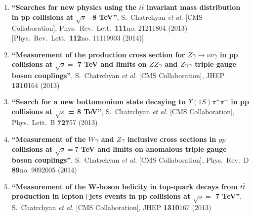 \begin{enumerate}
\item%
{\bf ``Searches for new physics using the $t\bar{t}$ invariant mass distribution in pp collisions at $\sqrt{s}$=8 TeV''}, 
  S.~Chatrchyan {\it et al.}  [CMS Collaboration], 
Phys.\ Rev.\ Lett.\  {\bf 111}no. 21211804 (2013)[Phys.\ Rev.\ Lett.\  {\bf 112}no. 11119903 (2014)] %


\item%
{\bf ``Measurement of the production cross section for $Z\gamma \to \nu\bar{\nu}\gamma$ in pp collisions at $\sqrt{s} =$ 7 TeV and limits on $ZZ\gamma$ and $Z\gamma\gamma$ triple gauge boson couplings''}, 
  S.~Chatrchyan {\it et al.}  [CMS Collaboration], 
JHEP {\bf 1310}164 (2013) %


\item%
{\bf ``Search for a new bottomonium state decaying to $\Upsilon(1S)\pi^+\pi^-$ in pp collisions at $\sqrt{s}$ = 8 TeV''}, 
  S.~Chatrchyan {\it et al.}  [CMS Collaboration], 
Phys.\ Lett.\ B {\bf 727}57 (2013) %


\item%
{\bf ``Measurement of the $W\gamma$ and $Z\gamma$ inclusive cross sections in $pp$ collisions at $\sqrt s=7$ TeV and limits on anomalous triple gauge boson couplings''}, 
  S.~Chatrchyan {\it et al.}  [CMS Collaboration], 
Phys.\ Rev.\ D {\bf 89}no. 9092005 (2014) %


\item%
{\bf ``Measurement of the W-boson helicity in top-quark decays from $t\bar{t}$ production in lepton+jets events in pp collisions at $\sqrt{s} =$ 7 TeV''}, 
  S.~Chatrchyan {\it et al.}  [CMS Collaboration], 
JHEP {\bf 1310}167 (2013) %



\end{enumerate}
